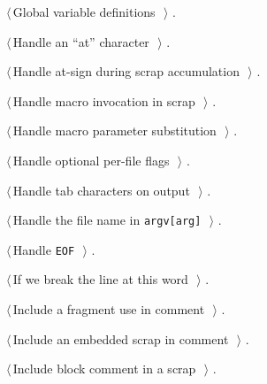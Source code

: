 \documentclass[a4paper]{report}
\begin{document}
{\begin{list}{}{\setlength{\itemsep}{-\parsep}\setlength{\itemindent}{-\leftmargin}}
\item $\langle\,$Global variable definitions\nobreak\ {\footnotesize {}}$\,\rangle$ {\footnotesize {\NWtxtRefIn} .}
\item $\langle\,$Handle an ``at'' character\nobreak\ {\footnotesize {}}$\,\rangle$ {\footnotesize {\NWtxtRefIn} .}
\item $\langle\,$Handle at-sign during scrap accumulation\nobreak\ {\footnotesize {}}$\,\rangle$ {\footnotesize {\NWtxtRefIn} .}
\item $\langle\,$Handle macro invocation in scrap\nobreak\ {\footnotesize {}}$\,\rangle$ {\footnotesize {\NWtxtRefIn} .}
\item $\langle\,$Handle macro parameter substitution\nobreak\ {\footnotesize {}}$\,\rangle$ {\footnotesize {\NWtxtRefIn} .}
\item $\langle\,$Handle optional per-file flags\nobreak\ {\footnotesize {}}$\,\rangle$ {\footnotesize {\NWtxtRefIn} .}
\item $\langle\,$Handle tab characters on output\nobreak\ {\footnotesize {}}$\,\rangle$ {\footnotesize {\NWtxtRefIn} .}
\item $\langle\,$Handle the file name in \verb|argv[arg]|\nobreak\ {\footnotesize {}}$\,\rangle$ {\footnotesize {\NWtxtRefIn} .}
\item $\langle\,$Handle \verb|EOF|\nobreak\ {\footnotesize {}}$\,\rangle$ {\footnotesize {\NWtxtRefIn} .}
\item $\langle\,$If we break the line at this word\nobreak\ {\footnotesize {}}$\,\rangle$ {\footnotesize {\NWtxtRefIn} .}
\item $\langle\,$Include a fragment use in comment\nobreak\ {\footnotesize {}}$\,\rangle$ {\footnotesize {\NWtxtRefIn} .}
\item $\langle\,$Include an embedded scrap in comment\nobreak\ {\footnotesize {}}$\,\rangle$ {\footnotesize {\NWtxtRefIn} .}
\item $\langle\,$Include block comment in a scrap\nobreak\ {\footnotesize {}}$\,\rangle$ {\footnotesize {\NWtxtRefIn} .}

\end{list}}
\end{document}
